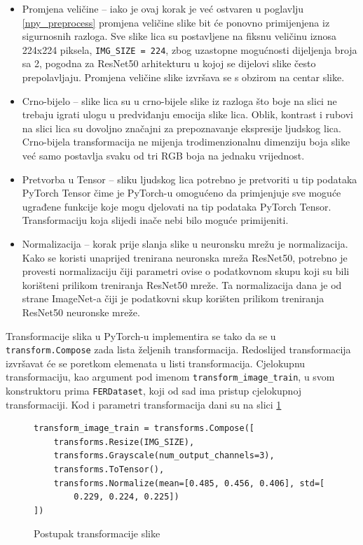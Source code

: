 \documentclass[times, utf8, zavrsni,numeric,pstricks]{fer}
\begin{document}
\begin{itemize}
	\item{Promjena veličine} – iako je ovaj korak je već ostvaren u poglavlju \ref{npy_preprocess} promjena veličine slike bit će ponovno primijenjena iz sigurnosnih razloga. Sve slike lica su postavljene na fiksnu veličinu iznosa 224x224 piksela, \lstinline"IMG_SIZE = 224", zbog uzastopne mogućnosti dijeljenja broja sa 2, pogodna za ResNet50 arhitekturu u kojoj se dijelovi slike često prepolavljaju. Promjena veličine slike izvršava se s obzirom na centar slike.
	\item{Crno-bijelo} – slike lica su u crno-bijele slike iz razloga što boje na slici ne trebaju igrati ulogu u predviđanju emocija slike lica. Oblik, kontrast i rubovi na slici lica su dovoljno značajni za prepoznavanje ekspresije ljudskog lica. Crno-bijela transformacija ne mijenja trodimenzionalnu dimenziju boja slike već samo postavlja svaku od tri RGB boja na jednaku vrijednost.
	\item{Pretvorba u Tensor} – sliku ljudskog lica  potrebno je pretvoriti u tip podataka PyTorch Tensor \cite{pytorch_tensor} čime je PyTorch-u omogućeno da primjenjuje sve moguće ugrađene funkcije koje mogu djelovati na tip podataka PyTorch Tensor. Transformaciju koja slijedi inače nebi bilo moguće primijeniti.	 
	\item{Normalizacija} – korak prije slanja slike u neuronsku mrežu je normalizacija. Kako se koristi unaprijed trenirana neuronska mreža ResNet50, potrebno je provesti normalizaciju čiji parametri ovise o podatkovnom skupu koji su bili korišteni prilikom treniranja ResNet50 mreže. Ta normalizacija dana je od strane ImageNet-a \cite{normalize_imagenet} čiji je podatkovni skup korišten prilikom treniranja ResNet50 neuronske mreže.
\end{itemize}

Transformacije slika u PyTorch-u implementira se tako da se u \lstinline"transform.Compose" zada lista željenih transformacija. Redoslijed transformacija izvršavat će se poretkom elemenata u listi transformacija. Cjelokupnu transformaciju, kao argument pod imenom \lstinline"transform_image_train", u svom konstruktoru prima \lstinline"FERDataset", koji od sad ima pristup cjelokupnoj transformaciji. Kod i parametri transformacija dani su na slici \ref{pic:pytorch_transform}

\begin{figure}[H]
\centering

\begin{Verbatim}[fontsize=\small]
transform_image_train = transforms.Compose([
    transforms.Resize(IMG_SIZE),
    transforms.Grayscale(num_output_channels=3),
    transforms.ToTensor(),
    transforms.Normalize(mean=[0.485, 0.456, 0.406], std=[
        0.229, 0.224, 0.225])
])
\end{Verbatim}
\caption{Postupak transformacije slike}
\label{pic:pytorch_transform}
\end{figure}
\end{document}
